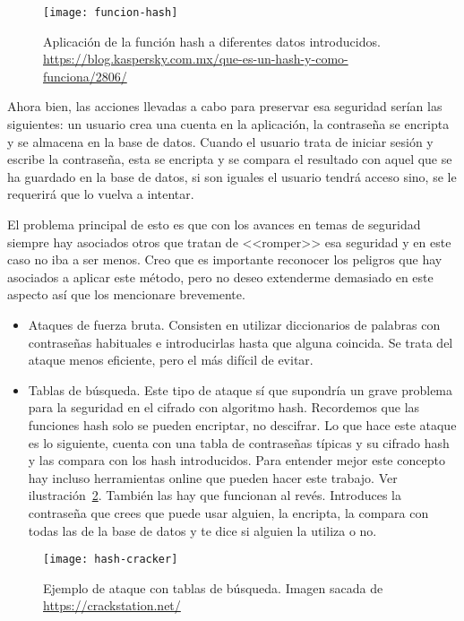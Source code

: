\begin{figure}[h]
\centering
\texttt{[image: funcion-hash]}
\caption{Aplicación de la función hash a diferentes datos introducidos. \url{https://blog.kaspersky.com.mx/que-es-un-hash-y-como-funciona/2806/}}
\label{fig:3.1}
\end{figure}

Ahora bien, las acciones llevadas a cabo para preservar esa seguridad serían las siguientes: un usuario crea una cuenta en la aplicación, la contraseña se encripta y se almacena en la base de datos. Cuando el usuario trata de iniciar sesión y escribe la contraseña, esta se encripta y se compara el resultado con aquel que se ha guardado en la base de datos, si son iguales el usuario tendrá acceso sino, se le requerirá que lo vuelva a intentar.

El problema principal de esto es que con los avances en temas de seguridad siempre hay asociados otros que tratan de <<romper>> esa seguridad y en este caso no iba a ser menos. Creo que es importante reconocer los peligros que hay asociados a aplicar este método, pero no deseo extenderme demasiado en este aspecto así que los mencionare brevemente.


\begin{itemize}
\item Ataques de fuerza bruta. Consisten en utilizar diccionarios de palabras con contraseñas habituales e introducirlas hasta que alguna coincida. Se trata del ataque menos eficiente, pero el más difícil de evitar.
\item Tablas de búsqueda. Este tipo de ataque sí que supondría un grave problema para la seguridad en el cifrado con algoritmo hash. Recordemos que las funciones hash solo se pueden encriptar, no descifrar. Lo que hace este ataque es lo siguiente, cuenta con una tabla de contraseñas típicas y su cifrado hash y las compara con los hash introducidos. Para entender mejor este concepto hay incluso herramientas online que pueden hacer este trabajo. Ver ilustración~\ref{fig:3.2}. También las hay que funcionan al revés. Introduces la contraseña que crees que puede usar alguien, la encripta, la compara con todas las de la base de datos y te dice si alguien la utiliza o no.
\end{itemize}

\begin{figure}[h]
\centering
\texttt{[image: hash-cracker]}
\caption{Ejemplo de ataque con tablas de búsqueda. Imagen sacada de \url{https://crackstation.net/}}
\label{fig:3.2}
\end{figure}

